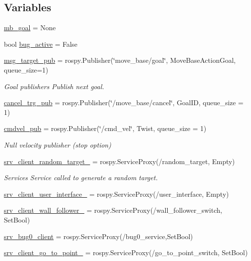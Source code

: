 \subsection*{Variables}
\begin{DoxyCompactItemize}
\item 
\hyperlink{namespacecontroller_a0f904cc2eef40a1c5ce7629120e3670a}{mb\+\_\+goal} = None
\item 
bool \hyperlink{namespacecontroller_ab6fae2c9650e9c1d6f77bcbfe8667443}{bug\+\_\+active} = False
\item 
\hyperlink{namespacecontroller_a07e67d3edbf36beb640f1be1f23ac99c}{msg\+\_\+target\+\_\+pub} = rospy.\+Publisher(\char`\"{}move\+\_\+base/goal\char`\"{}, Move\+Base\+Action\+Goal, queue\+\_\+size=1)
\begin{DoxyCompactList}\small\item\em Goal publishers Publish next goal. \end{DoxyCompactList}\item 
\hyperlink{namespacecontroller_a88ae131d2c0f84a0dfe387ebd15b2a09}{cancel\+\_\+trg\+\_\+pub} = rospy.\+Publisher(\char`\"{}/move\+\_\+base/cancel\char`\"{}, Goal\+ID, queue\+\_\+size = 1)
\item 
\hyperlink{namespacecontroller_ac5bba2b88eaa622e94ba61133ac349fa}{cmdvel\+\_\+pub} = rospy.\+Publisher(\char`\"{}/cmd\+\_\+vel\char`\"{}, Twist, queue\+\_\+size = 1)
\begin{DoxyCompactList}\small\item\em Null velocity publisher (stop option) \end{DoxyCompactList}\item 
\hyperlink{namespacecontroller_adbf0de4e6eb4bae0a6542d6314be0540}{srv\+\_\+client\+\_\+random\+\_\+target\+\_\+} = rospy.\+Service\+Proxy(\textquotesingle{}/random\+\_\+target\textquotesingle{}, Empty)
\begin{DoxyCompactList}\small\item\em Services Service called to generate a random target. \end{DoxyCompactList}\item 
\hyperlink{namespacecontroller_ad33164e09a0e6fa7ae3739d14837b1f3}{srv\+\_\+client\+\_\+user\+\_\+interface\+\_\+} = rospy.\+Service\+Proxy(\textquotesingle{}/user\+\_\+interface\textquotesingle{}, Empty)
\item 
\hyperlink{namespacecontroller_a504edbef27b5bb8d2dce7263ae16a1bd}{srv\+\_\+client\+\_\+wall\+\_\+follower\+\_\+} = rospy.\+Service\+Proxy(\textquotesingle{}/wall\+\_\+follower\+\_\+switch\textquotesingle{}, Set\+Bool)
\item 
\hyperlink{namespacecontroller_ac783da4ecabafe9488d3b5ceeb0f839d}{srv\+\_\+bug0\+\_\+client} = rospy.\+Service\+Proxy(\textquotesingle{}/bug0\+\_\+service\textquotesingle{},Set\+Bool)
\item 
\hyperlink{namespacecontroller_adb267b7bd1091c26caa203a40965a188}{srv\+\_\+client\+\_\+go\+\_\+to\+\_\+point\+\_\+} = rospy.\+Service\+Proxy(\textquotesingle{}/go\+\_\+to\+\_\+point\+\_\+switch\textquotesingle{}, Set\+Bool)
\end{DoxyCompactItemize}


